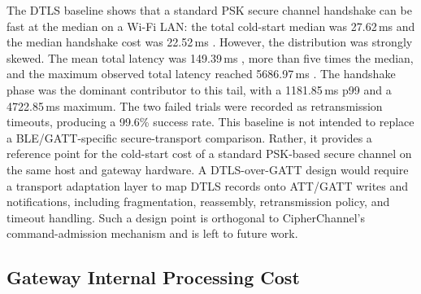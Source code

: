 \documentclass[journal]{IEEEtran}
\begin{document}
\begin{table}[!t]
\renewcommand{\arraystretch}{1.15}
\setlength{\tabcolsep}{2.5pt}
\caption{DTLS~1.2 PSK Cold-Start Secure Channel Baseline over UDP/IP Wi-Fi (ms, $N=500$, 498 succeeded)}
\label{tab:dtls_baseline}
\centering
{}
\end{table}

The DTLS baseline shows that a standard PSK secure channel handshake can be fast at the median on a Wi-Fi LAN: the total cold-start median was 27.62\,ms  and the median handshake cost was 22.52\,ms . However, the distribution was strongly skewed. The mean total latency was 149.39\,ms , more than five times the median, and the maximum observed total latency reached 5686.97\,ms . The handshake phase was the dominant contributor to this tail, with a 1181.85\,ms  p99 and a 4722.85\,ms  maximum. The two failed trials were recorded as retransmission timeouts, producing a 99.6\% success rate.
This baseline is not intended to replace a BLE/GATT-specific secure-transport comparison. Rather, it provides a reference point for the cold-start cost of a standard PSK-based secure channel on the same host and gateway hardware. A DTLS-over-GATT design would require a transport adaptation layer to map DTLS records onto ATT/GATT writes and notifications, including fragmentation, reassembly, retransmission policy, and timeout handling. Such a design point is orthogonal to CipherChannel’s command-admission mechanism and is left to future work.

\subsection{Gateway Internal Processing Cost}
\end{document}
